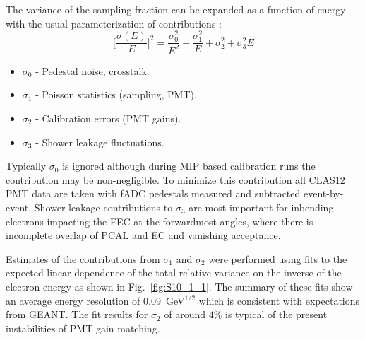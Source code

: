 The variance of the sampling fraction can be expanded as a function of energy with the usual parameterization of contributions \cite{ps1981}:
\begin{equation}
\biggl[\frac{\sigma(E)}{E}\biggr]^2 = \frac{\sigma^2_0}{E^2} + \frac{\sigma^2_1}{E} +\sigma^2_2 + \sigma^2_3 E 
\label{eq:sferror}
\end{equation}

\begin{itemize}
\item $\sigma_0$ - Pedestal noise, crosstalk.
\item $\sigma_1$ - Poisson statistics (sampling, PMT).
\item $\sigma_2$ - Calibration errors (PMT gains).
\item $\sigma_3$ - Shower leakage fluctuations.
\end{itemize}

Typically $\sigma_0$ is ignored although during MIP based calibration runs the contribution may be non-negligible.  To minimize this contribution all CLAS12 PMT data are taken with fADC pedestals measured and subtracted event-by-event.  Shower leakage contributions to $\sigma_3$ are most important for inbending electrons impacting the FEC at the forwardmost angles, where there is incomplete overlap of PCAL and EC and vanishing acceptance.  

Estimates of the contributions from $\sigma_1$ and $\sigma_2$ were performed using fits to the expected linear dependence of the total relative variance on the inverse of the electron energy as shown in Fig.~\ref{fig:S10_1_1}.  The summary of these fits show an average energy resolution of 0.09~GeV$^{1/2}$ which is consistent with expectations from GEANT.   The fit results for $\sigma_2$ of around $4\%$ is typical of the present instabilities of PMT gain matching.
 
